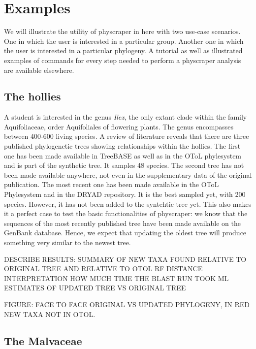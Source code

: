 \documentclass[]{article}
\begin{document}
\hypertarget{examples}{%
\section{Examples}\label{examples}}

We will illustrate the utility of physcraper in here with two use-case scenarios. One in which the user is interested in a particular group. Another one in which the user is interested in a particular phylogeny.
A tutorial as well as illustrated examples of commands for every step needed to perform a physcraper analysis are available elsewhere.

\hypertarget{the-hollies}{%
\subsection{The hollies}\label{the-hollies}}

A student is interested in the genus \emph{Ilex}, the only extant clade within the family Aquifoliaceae, order Aquifoliales of flowering plants.
The genus encompasses between 400-600 living species. A review of literature reveals that there are three published phylogenetic trees showing relationships within the hollies.
The first one has been made available in TreeBASE as well as in the OToL phylesystem and is part of the synthetic tree. It samples 48 species.
The second tree has not been made available anywhere, not even in the supplementary data of the original publication.
The most recent one has been made available in the OToL Phylesystem and in the DRYAD repository. It is the best sampled yet, with 200 species. However, it has not been added to the syntehtic tree yet.
This also makes it a perfect case to test the basic functionalities of physcraper: we know that the sequences of the most recently published tree have been made available on the GenBank database. Hence, we expect that updating the oldest tree will produce something very similar to the newest tree.

DESCRIBE RESULTS: SUMMARY OF NEW TAXA FOUND RELATIVE TO ORIGINAL TREE AND RELATIVE TO OTOL
RF DISTANCE INTERPRETATION
HOW MUCH TIME THE BLAST RUN TOOK
ML ESTIMATES OF UPDATED TREE VS ORIGINAL TREE

FIGURE: FACE TO FACE ORIGINAL VS UPDATED PHYLOGENY, IN RED NEW TAXA NOT IN OTOL.

\hypertarget{the-malvaceae}{%
\subsection{The Malvaceae}\label{the-malvaceae}}
\end{document}
